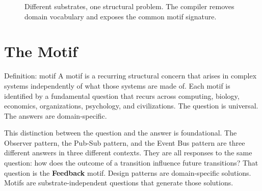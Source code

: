 \documentclass[11pt,a4paper]{article}
\newcommand{\motif}[1]{\textbf{\textcolor{atlasblue}{#1}}}
\begin{document}
\begin{figure}[ht]
\centering
{}
\caption{Different substrates, one structural problem. The compiler removes domain vocabulary and exposes the common motif signature.}
\end{figure}

\section{The Motif}

\begin{definitionbox}{Definition: motif}
A motif is a recurring structural concern that arises in complex systems independently of what those systems are made of. Each motif is identified by a fundamental question that recurs across computing, biology, economics, organizations, psychology, and civilizations. The question is universal. The answers are domain-specific.
\end{definitionbox}

This distinction between the question and the answer is foundational. The Observer pattern, the Pub-Sub pattern, and the Event Bus pattern are three different answers in three different contexts. They are all responses to the same question: how does the outcome of a transition influence future transitions? That question is the \motif{Feedback} motif. Design patterns are domain-specific solutions. Motifs are substrate-independent questions that generate those solutions.
\end{document}
